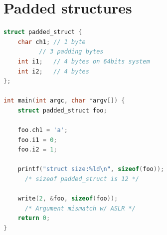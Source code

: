 \documentclass[english]{enstaPRE}
\begin{document}
\section{Padded structures}
\begin{lstlisting}[frame=single, caption=Writing a padded structure, label=lst:padstruct, language=C]
struct padded_struct {
    char ch1; // 1 byte
	      // 3 padding bytes
    int i1;   // 4 bytes on 64bits system
    int i2;   // 4 bytes
};

int main(int argc, char *argv[]) {
    struct padded_struct foo;
    
    foo.ch1 = 'a';
    foo.i1 = 0;
    foo.i2 = 1;
    
    printf("struct size:%ld\n", sizeof(foo)); 
      /* sizeof padded_struct is 12 */
    
    write(2, &foo, sizeof(foo));
      /* Argument mismatch w/ ASLR */
    return 0;
}
\end{lstlisting}\label{padded}
\end{document}
